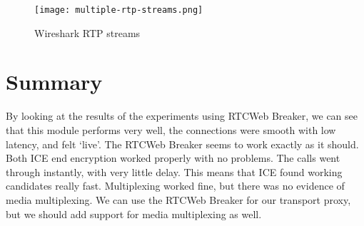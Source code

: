 \begin{figure}[here]
\centerline{\texttt{[image: multiple-rtp-streams.png]}}
\caption{Wireshark RTP streams}
\label{fig:wireshark-multiple-rtp-streams}
\end{figure}

\section{Summary}
By looking at the results of the experiments using RTCWeb Breaker, we can see that this module performs very well, the connections were smooth with low latency, and felt `live'. The RTCWeb Breaker seems to work exactly as it should. Both ICE end encryption worked properly with no problems. The calls went through instantly, with very little delay. This means that ICE found working candidates really fast. Multiplexing worked fine, but there was no evidence of media multiplexing. We can use the RTCWeb Breaker for our transport proxy, but we should add support for media multiplexing as well.